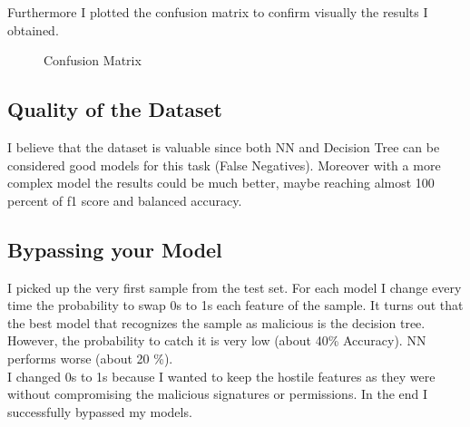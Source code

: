 \documentclass[unicode,11pt,a4paper,oneside,numbers=endperiod,openany]{scrartcl}
\begin{document}
Furthermore I plotted the confusion matrix to confirm visually the results I obtained. 
\begin{figure}
  \centering
  \hfill
  \hfill
  \caption{Confusion Matrix}
\end{figure}
\subsection{Quality of the Dataset}
I believe that the dataset is valuable since both NN and Decision Tree can be considered good models for this task (False Negatives). 
Moreover with a more complex model the results could be much better, maybe reaching almost 100 percent of f1 score and balanced accuracy. 



\subsection{Bypassing your Model}
I picked up the very first sample from the test set. For each model I change every time the probability to swap 0s to 1s each feature of the sample. 
It turns out that the best model that recognizes the sample as malicious is the decision tree. However, the probability to catch it is very low (about 40\% Accuracy). NN performs worse (about 20 \%).\\
I changed 0s to 1s because I wanted to keep the hostile features as they were without compromising the malicious signatures or permissions.  
In the end I successfully bypassed my models. 
\end{document}

